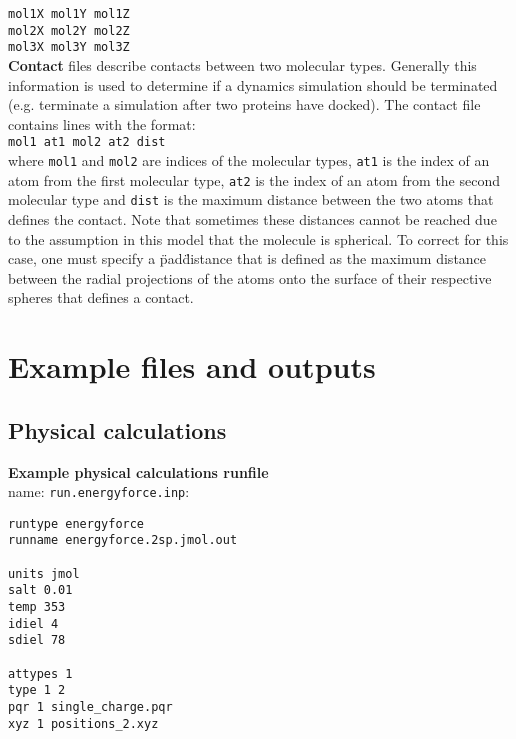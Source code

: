 \texttt{mol1X  mol1Y  mol1Z }\\
\texttt{mol2X  mol2Y  mol2Z }\\
\texttt{mol3X  mol3Y  mol3Z }\\

\textbf{Contact} files describe contacts between two molecular types. Generally this information is used to determine if a dynamics 
simulation should be terminated (e.g. terminate a simulation after two proteins have docked). The contact file contains lines with the format: \\

\texttt{mol1  at1 mol2 at2 dist}\\

where \texttt{mol1} and \texttt{mol2} are indices of the molecular types, \texttt{at1} is the index of an atom from the first 
molecular type, \texttt{at2} is the index of an atom from the second molecular type and \texttt{dist} is the maximum distance between
the two atoms that defines the contact.  Note that sometimes these distances cannot be reached due to the assumption in this model that 
the molecule is spherical. To correct for this case, one must specify a \"pad\"  distance that is defined as the maximum distance between 
the radial projections of the atoms onto the surface of their respective spheres that defines a contact.

\clearpage




\chapter{Example files and outputs}

\section{Physical calculations}

\textbf{Example physical calculations runfile} \\

name:  \texttt{run.energyforce.inp}:
\begin{lstlisting}[style = MyBash]
runtype energyforce
runname energyforce.2sp.jmol.out

units jmol
salt 0.01
temp 353
idiel 4 
sdiel 78

attypes 1
type 1 2
pqr 1 single_charge.pqr
xyz 1 positions_2.xyz
\end{lstlisting}
\medskip

